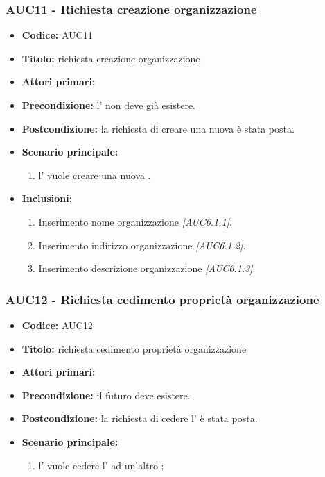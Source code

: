 \documentclass[casi-duso]{subfiles}
\begin{document}
\subsubsection{AUC11 - Richiesta creazione organizzazione}%
\label{subsub:AUC11}
\begin{itemize}
  \item \textbf{Codice:} AUC11
  \item \textbf{Titolo:} richiesta creazione organizzazione
  \item \textbf{Attori primari:} 
  \item \textbf{Precondizione:} l'  non deve già esistere.
  \item \textbf{Postcondizione:} la richiesta di creare una nuova  è stata posta.
  \item \textbf{Scenario principale:}
  \begin{enumerate}
    \item l'  vuole creare una nuova .
  \end{enumerate}
  \item \textbf{Inclusioni:}
  \begin{enumerate}
    \item Inserimento nome organizzazione \emph{[AUC6.1.1]}.
    \item Inserimento indirizzo organizzazione \emph{[AUC6.1.2]}.
    \item Inserimento descrizione organizzazione \emph{[AUC6.1.3]}.
  \end{enumerate}
\end{itemize}

\subsubsection{AUC12 - Richiesta cedimento proprietà organizzazione}%
\label{subsub:AUC12}
\begin{itemize}
  \item \textbf{Codice:} AUC12
  \item \textbf{Titolo:} richiesta cedimento proprietà organizzazione
  \item \textbf{Attori primari:} 
  \item \textbf{Precondizione:} il futuro  deve esistere.
  \item \textbf{Postcondizione:} la richiesta di cedere l' è stata posta.
  \item \textbf{Scenario principale:} 
  \begin{enumerate}
    \item l'  vuole cedere l' ad un'altro ;
  \end{enumerate}
\end{itemize}
\end{document}
